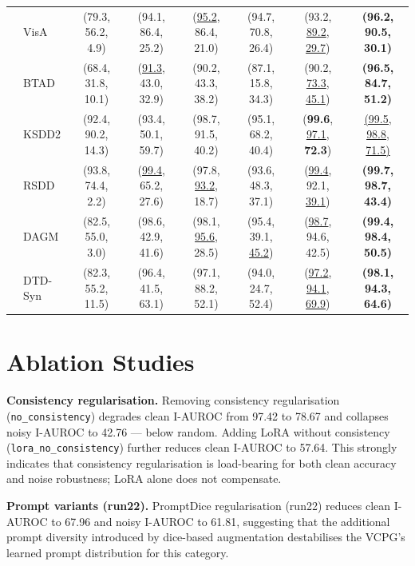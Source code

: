 \documentclass[11pt]{article}
\begin{document}
\begin{table}[h]
{\begin{tabular}{llcccccc}
 & VisA      & (79.3, 56.2, 4.9)  & (94.1, 86.4, 25.2) & (\underline{95.2}, 86.4, 21.0) & (94.7, 70.8, 26.4) & (93.2, \underline{89.2}, \underline{29.7}) & \textbf{(96.2, 90.5, 30.1)} \\
 & BTAD      & (68.4, 31.8, 10.1) & (\underline{91.3}, 43.0, 32.9) & (90.2, 43.3, 38.2) & (87.1, 15.8, 34.3) & (90.2, \underline{73.3}, \underline{45.1}) & \textbf{(96.5, 84.7, 51.2)} \\
 & KSDD2     & (92.4, 90.2, 14.3) & (93.4, 50.1, 59.7) & (98.7, 91.5, 40.2) & (95.1, 68.2, 40.4) & (\textbf{99.6}, \underline{97.1}, \textbf{72.3}) & \underline{(99.5, 98.8, 71.5)} \\
 & RSDD      & (93.8, 74.4, 2.2)  & (\underline{99.4}, 65.2, 27.6) & (97.8, \underline{93.2}, 18.7) & (93.6, 48.3, 37.1) & (\underline{99.4}, 92.1, \underline{39.1}) & \textbf{(99.7, 98.7, 43.4)} \\
 & DAGM      & (82.5, 55.0, 3.0)  & (98.6, 42.9, 41.6) & (98.1, \underline{95.6}, 28.5) & (95.4, 39.1, \underline{45.2}) & (\underline{98.7}, 94.6, 42.5) & \textbf{(99.4, 98.4, 50.5)} \\
 & DTD-Syn   & (82.3, 55.2, 11.5) & (96.4, 41.5, 63.1) & (97.1, 88.2, 52.1) & (94.0, 24.7, 52.4) & (\underline{97.2}, \underline{94.1}, \underline{69.9}) & \textbf{(98.1, 94.3, 64.6)} \\
\bottomrule
\end{tabular}%
}
\end{table}

\section{Ablation Studies}

\textbf{Consistency regularisation.} Removing consistency regularisation
(\texttt{no\_consistency}) degrades clean I-AUROC from 97.42 to 78.67 and collapses
noisy I-AUROC to 42.76 — below random. Adding LoRA without consistency
(\texttt{lora\_no\_consistency}) further reduces clean I-AUROC to 57.64. This
strongly indicates that consistency regularisation is load-bearing for both
clean accuracy and noise robustness; LoRA alone does not compensate.

\textbf{Prompt variants (run22).} PromptDice regularisation (run22) reduces clean
I-AUROC to 67.96 and noisy I-AUROC to 61.81, suggesting that the additional prompt
diversity introduced by dice-based augmentation destabilises the VCPG's learned
prompt distribution for this category.
\end{document}
